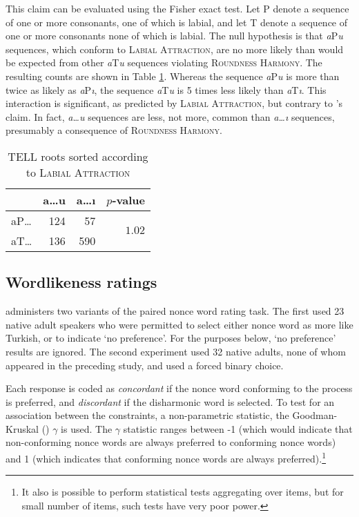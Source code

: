 \noindent 
This claim can be evaluated using the Fisher exact test. Let P denote a sequence of one or more consonants, one of which is labial, and let T denote a sequence of one or more consonants none of which is labial. 
The null hypothesis is that \emph{a}P\emph{u} sequences, which conform to \textsc{Labial Attraction}, are no more likely than would be expected from other \emph{a}T\emph{u} sequences violating \textsc{Roundness Harmony}. 
The resulting counts are shown in Table \ref{las}.
Whereas the sequence \emph{a}P\emph{u} is more than twice as likely as \emph{a}P\emph{ı}, the sequence \emph{a}T\emph{u} is 5 times less likely than \emph{a}T\emph{ı}. 
This interaction is significant, as predicted by \textsc{Labial Attraction}, but contrary to \citeauthor{Clements1982}'s claim.
In fact, \emph{a\ldots{}u} sequences are less, not more, common than \emph{a\ldots{}ı} sequences, presumably a consequence of \textsc{Roundness Harmony}.

\begin{table}[t]
\centering
\begin{tabular}{lrrr}
\toprule
       & a\ldots{}u & a\ldots{}ı & $p$-value                      \\
\midrule
aP\ldots{} & 124    & 57     & \multirow{2}{*}{$1.02$\e{-36}} \\
aT\ldots{} & 136    & 590    &                                \\
\bottomrule
\end{tabular}
\caption{TELL roots sorted according to \textsc{Labial Attraction}}
\label{las}
\end{table}

\subsection{Wordlikeness ratings}

\citet{Zimmer1969} administers two variants of the paired nonce word rating task. 
The first used 23 native adult speakers who were permitted to select either nonce word as more like Turkish, or to indicate `no preference'. 
For the purposes below, `no preference' results are ignored. 
The second experiment used 32 native adults, none of whom appeared in the preceding study, and used a forced binary choice.

Each response is coded as \emph{concordant} if the nonce word conforming to the process is preferred, and \emph{discordant} if the disharmonic word is selected. 
To test for an association between the constraints, a non-parametric statistic, the Goodman-Kruskal (\citeyear{Goodman1954}) $\gamma$ is used. 
The $\gamma$ statistic ranges between -1 (which would indicate that non-conforming nonce words are always preferred to conforming nonce words) and 1 (which indicates that conforming nonce words are always preferred).\footnote{
    It also is possible to perform statistical tests aggregating over items, but for small number of items, such tests have very poor power.}

